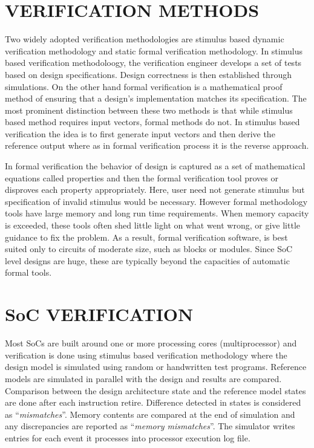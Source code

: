 \section{VERIFICATION METHODS}
Two widely adopted verification methodologies are stimulus based dynamic verification methodology and static formal verification methodology. In stimulus based verification methodoloogy, the verification engineer develops a set of tests based on design specifications. Design correctness is then established through simulations. On the other hand formal verification is a mathematical proof method of ensuring that a design's implementation matches its specification\cite{ieee:segev:2004}. The most prominent distinction between these two methods is that while stimulus based method requires input vectors, formal methods do not. In stimulus based verification the idea is to first generate input vectors and then derive the reference output where as in formal verification process it is the reverse approach.

In formal verification the behavior of design is captured as a set of mathematical equations called properties and then the formal verification tool proves or disproves each property appropriately. Here, user need not generate stimulus but specification of invalid stimulus would be necessary. However formal methodology tools have large memory and long run time requirements. When memory capacity is exceeded, these tools often shed little light on what went wrong, or give little guidance to fix the problem. As a result, formal verification software, is best suited only to circuits of moderate size, such as blocks or modules. Since SoC level designs are huge, these are typically beyond the capacities of automatic formal tools\cite{ieee:formal:2004}. 

\section{SoC VERIFICATION}
Most SoCs are built around one or more processing cores (multiprocessor) and verification is done using stimulus based verification methodology where the design model is simulated using random or handwritten test programs. Reference models are simulated in parallel with the design and results are compared.  Comparison between the design architecture state and the reference model states are done after each instruction retire. Difference detected in states is considered as ``{\it mismatches}''. Memory contents are compared at the end of simulation and any discrepancies are reported as ``{\it memory mismatches}''.  The simulator writes entries for each event it processes into processor execution log file.

